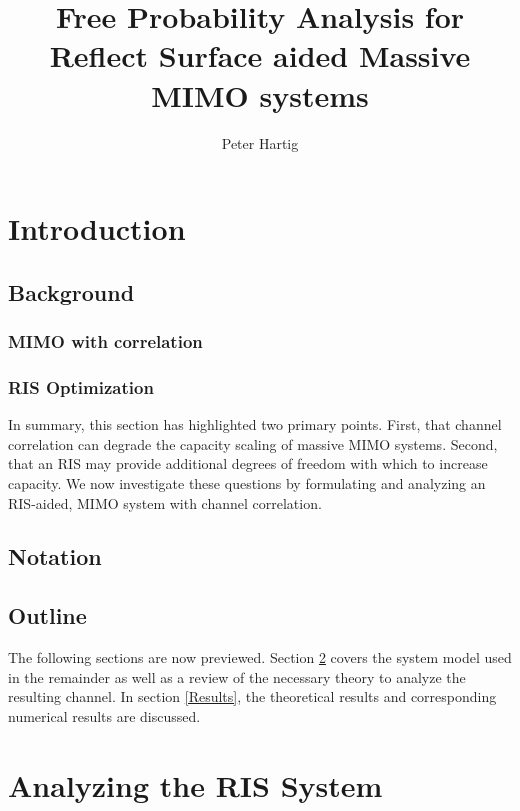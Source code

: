 \documentclass[12pt,a4paper]{report}
\title{Free Probability Analysis for Reflect Surface aided Massive MIMO systems}
\author{Peter Hartig}
\begin{document}
\maketitle
\begin{abstract}

\end{abstract}
%
\tableofcontents
\chapter{Introduction}
\section{Background}\label{Background}

\par
\subsection{MIMO with correlation}\label{mimo_corr}

\par
\subsection{RIS Optimization}\label{irs_opt}

\par
In summary, this section has highlighted two primary points. First, that channel correlation can degrade the capacity scaling of massive MIMO systems. Second, that an RIS may provide additional degrees of freedom with which to increase capacity. We now investigate these questions by formulating and analyzing an RIS-aided, MIMO system with channel correlation. 
\section{Notation}

\section{Outline}
The following sections are now previewed. Section \ref{system_model} covers the system model used in the remainder as well as a review of the necessary theory to analyze the resulting channel. In section \ref{Results}, the theoretical results and corresponding numerical results are discussed. 

\chapter{Analyzing the RIS System}\label{system_model}
\end{document}
